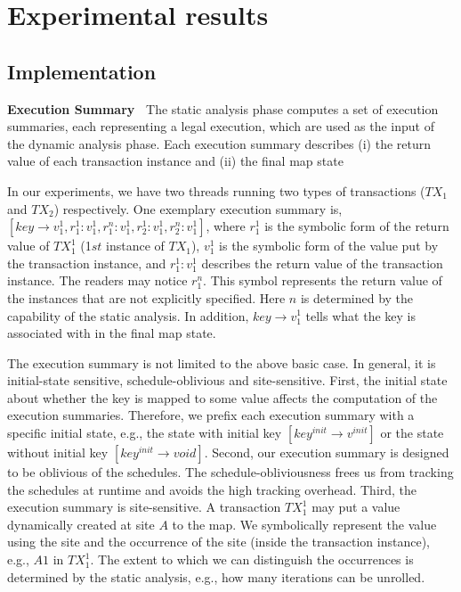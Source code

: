 \section{Experimental results}
\subsection{Implementation}

{\bf Execution Summary\ } The static analysis phase computes a set of execution summaries, each representing a legal execution, which are used as the input of the dynamic analysis phase.
Each execution summary describes (i) the return value of each transaction instance and (ii) the final map state
 

In our experiments,  we have two threads running two types of transactions ($TX_1$ and $TX_2$) respectively. One exemplary execution summary is, $[key\rightarrow v^1_1, r^1_1:v^1_1, r^n_1:v^1_1, r^1_2:v^1_1, r^n_2:v^1_1]$, where $r^1_1$ is the symbolic form of the return value of $TX^1_1$ (1$st$ instance of $TX_1$), $v^1_1$ is the symbolic form of the value put by the transaction instance, and $r^1_1:v^1_1$ describes the return value of the transaction instance. The readers may notice $r^n_1$. This symbol represents the return value of the instances that are not explicitly specified.  Here $n$ is determined by the capability of the static analysis.
In addition, $key\rightarrow v^1_1$ tells what the key is associated with in the final map state. 

The execution summary is not limited to the above basic case. In general, it is initial-state sensitive, schedule-oblivious and site-sensitive. 
First, the initial state about whether the key is mapped to some value affects the computation of the execution summaries. Therefore, we prefix each execution summary with a specific initial state, e.g., the state with initial key $[key^{init}\rightarrow v^{init}]$ or the state without initial key $[key^{init}\rightarrow void]$.
Second, our execution summary is designed to be oblivious of the schedules. The schedule-obliviousness frees us from tracking the schedules at runtime and avoids the high tracking overhead. Third, the execution summary is site-sensitive. A transaction $TX^1_1$ may put a value dynamically created at site $A$ to the map. We symbolically represent the value using the site and the occurrence of the site (inside the transaction instance), e.g., $A1$ in $TX^1_1$. The extent to which we can distinguish the occurrences is determined by the static analysis, e.g., how many iterations can be unrolled.


